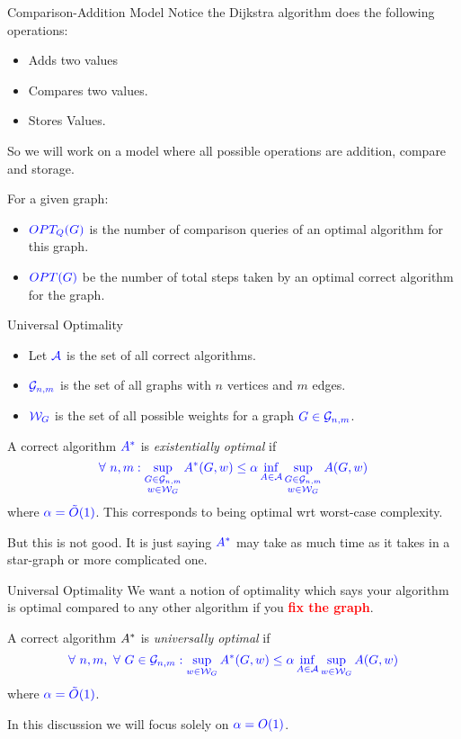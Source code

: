 \documentclass[10pt, handout]{beamer}
\begin{document}
\begin{frame}{Comparison-Addition Model}
	Notice the Dijkstra algorithm does the following operations: \begin{itemize}
		\item Adds two values
		\item Compares two values.
		\item Stores Values.
	\end{itemize}So we will work on a model where all possible operations are  addition, compare and storage. \vfill\pause

	For a given graph:
	\begin{itemize}
		\item $\mathcolor{blue}{OPT_Q(G)}$ is the number of comparison queries of an optimal algorithm for this graph.\vfill
		\item $\mathcolor{blue}{OPT(G)}$ be the number of total steps taken by an optimal correct algorithm for the graph.
	\end{itemize}

\end{frame}
\begin{frame}{Universal Optimality}
	\begin{itemize}
		\item Let $\mathcolor{blue}{\mathcal{A}}$ is the set of all correct algorithms.
		\item $\mathcolor{blue}{\mathcal{G}_{n,m}}$ is the set of all graphs with $n$ vertices and $m$ edges.
		\item $\mathcolor{blue}{\mathcal{W}_G}$ is the set of all possible weights for a graph $\mathcolor{blue}{G\in\mathcal{G}_{n,m}}$.
	\end{itemize} \pause\vfill
	A correct algorithm $\mathcolor{blue}{A^*}$ is \emph{existentially optimal} if $$\mathcolor{blue}{\forall\ n,m: \sup\limits_{\substack{G\in\mathcal{G}_{n,m}\\ w\in \mathcal{W}_G} }A^*(G,w)\leq \alpha\inf\limits_{A\in \mathcal{A}}\sup\limits_{\substack{G\in\mathcal{G}_{n,m}\\ w\in \mathcal{W}_G} } A(G,w)}$$ where $\mathcolor{blue}{\alpha=\tilde{O}(1)}$. This corresponds to being optimal wrt worst-case complexity.\pause  \vfill

	But this is not good. It is just saying $\mathcolor{blue}{A^*}$ may take as much time as it takes in a star-graph or more complicated one.
\end{frame}
\begin{frame}{Universal Optimality}
	We want a notion of optimality which says your algorithm is optimal compared to any other algorithm if you \textcolor{red}{\textbf{fix the graph}}.\pause  \vfill

	A correct algorithm $\mathcolor{blue}{}A^*$ is \emph{universally optimal} if$$\mathcolor{blue}{\forall\ n,m,\ \forall\ G\in \mathcal{G}_{n,m}: \sup\limits_{w\in \mathcal{W}_G} A^*(G,w)\leq \alpha\inf\limits_{A\in \mathcal{A}}\sup\limits_{w\in \mathcal{W}_G} A(G,w)}$$ where $\mathcolor{blue}{\alpha=\tilde{O}(1)}$.  \pause \vfill

	In this discussion we will focus solely on  $\mathcolor{blue}{\alpha=O(1)}$.
\end{frame}
\end{document}
